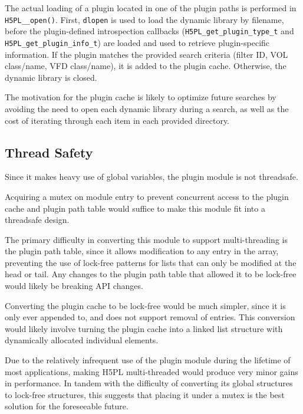 The actual loading of a plugin located in one of the plugin paths is performed in \texttt{H5PL\_\_open()}. First, \texttt{dlopen} is used to load the dynamic library by filename, before the plugin-defined introspection callbacks (\texttt{H5PL\_get\_plugin\_type\_t} and \texttt{H5PL\_get\_plugin\_info\_t}) are loaded and used to retrieve plugin-specific information. If the plugin matches the provided search criteria (filter ID, VOL class/name, VFD class/name), it is added to the plugin cache. Otherwise, the dynamic library is closed.

The motivation for the plugin cache is likely to optimize future searches by avoiding the need to open each dynamic library during a search, as well as the cost of iterating through each item in each provided directory.

\subsection{Thread Safety}

Since it makes heavy use of global variables, the plugin module is not threadsafe. 

Acquiring a mutex on module entry to prevent concurrent access to the plugin cache and plugin path table would suffice to make this module fit into a threadsafe design.

The primary difficulty in converting this module to support multi-threading is the plugin path table, since it allows modification to any entry in the array, preventing the use of lock-free patterns for lists that can only be modified at the head or tail. Any changes to the plugin path table that allowed it to be lock-free would likely be breaking API changes. 

Converting the plugin cache to be lock-free would be much simpler, since it is only ever appended to, and does not support removal of entries. This conversion would likely involve turning the plugin cache into a linked list structure with dynamically allocated individual elements.

Due to the relatively infrequent use of the plugin module during the lifetime of most applications, making H5PL multi-threaded would produce very minor gains in performance. In tandem with the difficulty of converting its global structures to lock-free structures, this suggests that placing it under a mutex is the best solution for the foreseeable future.
